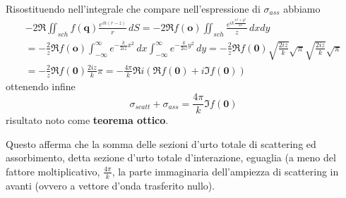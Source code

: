 Risostituendo nell'integrale che compare nell'espressione di $\sigma_{ass}$ abbiamo
\begin{gather*}
	- 2 \Re\iint_{sch}f(\bm{q})\frac{e^{ik(r-z)}}{r} \, dS =
	- 2 \Re f(\bm{o}) \iint_{sch}\frac{e^{ik \frac{x^2 + y^2}{2z}}}{z} \, dxdy\\
	= - \frac{2}{z} \Re f(\bm{o}) \int_{- \infty}^{\infty} e ^{- \frac{k}{2iz}x^2} \, dx
	\int_{- \infty}^{\infty} e ^{- \frac{k}{2iz}y^2} \, dy = - \frac{2}{z} \Re f(\bm{0}) \sqrt{\frac{2iz}{k}}\sqrt{\pi}\sqrt{\frac{2iz}{k}}\sqrt{\pi}\\
	= - \frac{2}{z} \Re f(\bm{0}) \frac{2iz}{k}\pi = - \frac{4 \pi}{k} \Re i (\Re f(\bm{0}) + i  \Im f(\bm{0}))
\end{gather*}
ottenendo infine
\begin{equation}
	\boxed{\sigma_{scatt} + \sigma_{ass} = \frac{4 \pi}{k} \Im f(\bm{0})}
	\label{eq:optical-theorem}
\end{equation}
risultato noto come \textbf{teorema ottico}.

Questo afferma che la somma delle sezioni d'urto totale di scattering ed
assorbimento, detta sezione d'urto totale d'interazione, eguaglia (a
meno del fattore moltiplicativo, $\frac{4 \pi}{k}$, la parte
immaginaria dell'ampiezza di scattering in avanti (ovvero a vettore
d'onda trasferito nullo).
\bigskip


